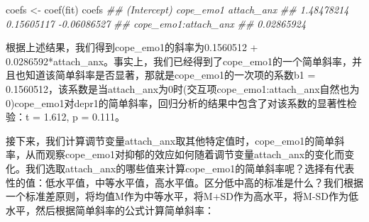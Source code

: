 \documentclass[
  chinese-hans,
  letterpaper,
  DIV=11,
  numbers=noendperiod]{scrartcl}
\newenvironment{Shaded}{\begin{snugshade}}{\end{snugshade}}
\newcommand{\DocumentationTok}[1]{\textcolor[rgb]{0.37,0.37,0.37}{\textit{#1}}}
\newcommand{\FunctionTok}[1]{\textcolor[rgb]{0.28,0.35,0.67}{#1}}
\newcommand{\NormalTok}[1]{\textcolor[rgb]{0.00,0.23,0.31}{#1}}
\newcommand{\OtherTok}[1]{\textcolor[rgb]{0.00,0.23,0.31}{#1}}
\begin{document}
\begin{Shaded}
\begin{Highlighting}[numbers=left,,]
\NormalTok{coefs }\OtherTok{\textless{}{-}} \FunctionTok{coef}\NormalTok{(fit)}
\NormalTok{coefs}
\DocumentationTok{\#\#          (Intercept)            cope\_emo1           attach\_anx }
\DocumentationTok{\#\#           1.48478214           0.15605117          {-}0.06086527 }
\DocumentationTok{\#\# cope\_emo1:attach\_anx }
\DocumentationTok{\#\#           0.02865924}
\end{Highlighting}
\end{Shaded}

根据上述结果，我们得到cope\_emo1的斜率为0.1560512 +
0.0286592*attach\_anx。事实上，我们已经得到了cope\_emo1的一个简单斜率，并且也知道该简单斜率是否显著，那就是cope\_emo1的一次项的系数b1
=
0.1560512，该系数是当attach\_anx为0时(交互项cope\_emo1:attach\_anx自然也为0)cope\_emo1对depr1的简单斜率，回归分析的结果中包含了对该系数的显著性检验：t
= 1.612, p = 0.111。

接下来，我们计算调节变量attach\_anx取其他特定值时，cope\_emo1的简单斜率，从而观察cope\_emo1对抑郁的效应如何随着调节变量attach\_anx的变化而变化。我们选取attach\_anx的哪些值来计算cope\_emo1的简单斜率呢？选择有代表性的值：低水平值，中等水平值，高水平值。区分低中高的标准是什么？我们根据一个标准差原则，将均值M作为中等水平，将M+SD作为高水平，将M-SD作为低水平，然后根据简单斜率的公式计算简单斜率：
\end{document}

